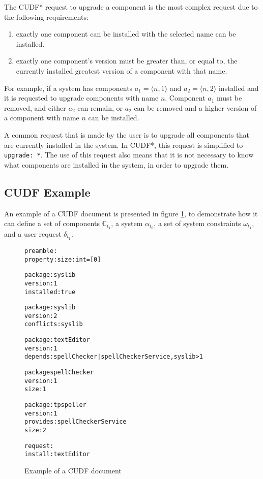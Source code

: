 The CUDF* request to upgrade a component is the most complex request due to the following requirements:
\begin{enumerate}
  \item exactly one component can be installed with  the selected name can be installed.
  \item exactly one component's version must be greater than, or equal to, the currently installed greatest version of a component with that name.
\end{enumerate}
For example, if a system has components $a_1 = \langle n,1 \rangle$ and $a_2 = \langle n,2 \rangle$ installed and it is requested to upgrade components with name $n$.
Component $a_1$ must be removed, and either $a_2$ can remain, or $a_2$ can be removed and a higher version of a component with name $n$ can be installed.

A common request that is made by the user is to upgrade all components that are currently installed in the system.
In CUDF*, this request is simplified to \texttt{upgrade: *}.
The use of this request also means that it is not necessary to know what components are installed in the system, in order to upgrade them.

\subsection{CUDF Example}
\label{formal.example}
An example of a CUDF document is presented in figure \ref{formal.CUDFEXAMPLE},
to demonstrate how it can define a set of components $\mathbb{C}_{t_1}$, a system $\alpha_{t_{0}}$, 
a set of system constraints $\omega_{t_1}$, 
and a user request $\delta_{t_1}$.

\begin{figure}[ht] 
\begin{center}
\begin{alltt}
preamble:
property: size: int = [0]

package: syslib
version: 1
installed: true

package: syslib
version: 2
conflicts: syslib

package: textEditor
version: 1
depends: spellChecker | spellCheckerService, syslib > 1

package spellChecker
version: 1
size: 1

package: tpspeller
version: 1
provides: spellCheckerService
size: 2

request:
install:textEditor
\end{alltt}
  \caption[CUDF Example]{Example of a CUDF document}
  \label{formal.CUDFEXAMPLE}
\end{center}
\end{figure} 



